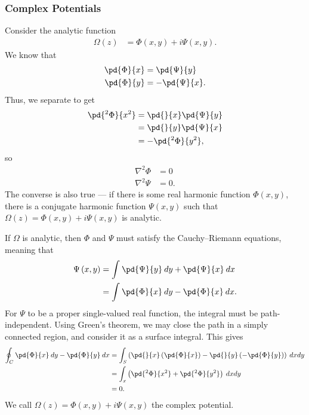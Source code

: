 \documentclass[10pt]{mypackage}
\begin{document}
\subsubsection{Complex Potentials}%
Consider the analytic function
\begin{align*}
  \Omega(z) &= \Phi\left( x,y \right) + i\Psi\left( x,y \right).
\end{align*}
We know that
\begin{align*}
  \pd{\Phi}{x} &= \pd{\Psi}{y}\\
  \pd{\Phi}{y} &= -\pd{\Psi}{x}.
\end{align*}
Thus, we separate to get
\begin{align*}
  \pd{^2\Phi}{x^2} &= \pd{}{x}\pd{\Psi}{y}\\
                   &= \pd{}{y}\pd{\Psi}{x}\\
                   &= -\pd{^2\Phi}{y^2},
\end{align*}
so
\begin{align*}
  \nabla^2\Phi &= 0\\
  \nabla^2\Psi &= 0.
\end{align*}
The converse is also true --- if there is some real harmonic function $\Phi\left( x,y \right)$, there is a conjugate harmonic function $\Psi\left( x,y \right)$ such that $\Omega\left( z \right) = \Phi\left( x,y \right) + i\Psi\left( x,y \right)$ is analytic.\newline

If $\Omega$ is analytic, then $\Phi$ and $\Psi$ must satisfy the Cauchy--Riemann equations, meaning that
\begin{align*}
  \Psi\left( x,y \right) &= \int_{}^{} \pd{\Psi}{y}\:dy + \pd{\Psi}{x}\:dx\\
                         &= \int_{}^{} \pd{\Phi}{x}\:dy - \pd{\Phi}{x}\:dx.
\end{align*}
For $\Psi$ to be a proper single-valued real function, the integral must be path-independent. Using Green's theorem, we may close the path in a simply connected region, and consider it as a surface integral. This gives
\begin{align*}
  \oint_{C} \pd{\Phi}{x}\:dy - \pd{\Phi}{y}\:dx &= \int_{S}^{} \left( \pd{}{x}\left( \pd{\Phi}{x} \right) - \pd{}{y}\left( -\pd{\Phi}{y} \right) \right)\:dxdy\\
                                                &= \int_{x}^{} \left( \pd{^2\Phi}{x^2} + \pd{^2\Phi}{y^2} \right)\:dxdy\\
                                                &= 0.
\end{align*}
We call $\Omega(z) = \Phi\left( x,y \right) + i\Psi\left( x,y \right)$ the complex potential.\newline
\end{document}
